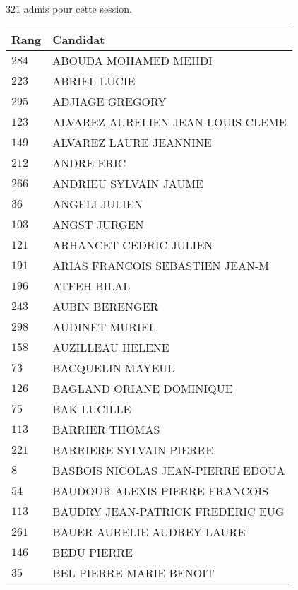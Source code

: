 



  $321$ admis pour cette session.

  \begin{xltabular}{\linewidth}{|l|X|}
    \hline
    \textbf{Rang} & \textbf{Candidat} \\
    \hline
    $284$ & ABOUDA MOHAMED MEHDI \\
    \hline
    $223$ & ABRIEL LUCIE \\
    \hline
    $295$ & ADJIAGE GREGORY \\
    \hline
    $123$ & ALVAREZ AURELIEN JEAN-LOUIS CLEME \\
    \hline
    $149$ & ALVAREZ LAURE JEANNINE \\
    \hline
    $212$ & ANDRE ERIC \\
    \hline
    $266$ & ANDRIEU SYLVAIN JAUME \\
    \hline
    $36$ & ANGELI JULIEN \\
    \hline
    $103$ & ANGST JURGEN \\
    \hline
    $121$ & ARHANCET CEDRIC JULIEN \\
    \hline
    $191$ & ARIAS FRANCOIS SEBASTIEN JEAN-M \\
    \hline
    $196$ & ATFEH BILAL \\
    \hline
    $243$ & AUBIN BERENGER \\
    \hline
    $298$ & AUDINET MURIEL \\
    \hline
    $158$ & AUZILLEAU HELENE \\
    \hline
    $73$ & BACQUELIN MAYEUL \\
    \hline
    $126$ & BAGLAND ORIANE DOMINIQUE \\
    \hline
    $75$ & BAK LUCILLE \\
    \hline
    $113$ & BARRIER THOMAS \\
    \hline
    $221$ & BARRIERE SYLVAIN PIERRE \\
    \hline
    $8$ & BASBOIS NICOLAS JEAN-PIERRE EDOUA \\
    \hline
    $54$ & BAUDOUR ALEXIS PIERRE FRANCOIS \\
    \hline
    $113$ & BAUDRY JEAN-PATRICK FREDERIC EUG \\
    \hline
    $261$ & BAUER AURELIE AUDREY LAURE \\
    \hline
    $146$ & BEDU PIERRE \\
    \hline
    $35$ & BEL PIERRE MARIE BENOIT \\

\end{xltabular}
